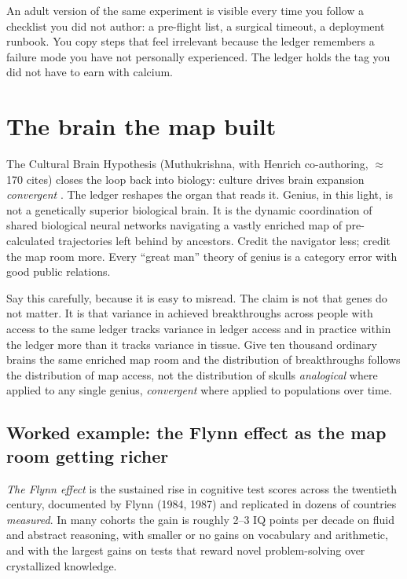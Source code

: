 An adult version of the same experiment is visible every time you follow a checklist you did not author: a pre-flight list, a surgical timeout, a deployment runbook. You copy steps that feel irrelevant because the ledger remembers a failure mode you have not personally experienced. The ledger holds the tag you did not have to earn with calcium.

\section{The brain the map built}

The Cultural Brain Hypothesis (Muthukrishna, with Henrich co-authoring, $\approx$170 cites) closes the loop back into biology: culture drives brain expansion \textit{convergent} \citep{henrich}. The ledger reshapes the organ that reads it. Genius, in this light, is not a genetically superior biological brain. It is the dynamic coordination of shared biological neural networks navigating a vastly enriched map of pre-calculated trajectories left behind by ancestors. Credit the navigator less; credit the map room more. Every ``great man'' theory of genius is a category error with good public relations.

Say this carefully, because it is easy to misread. The claim is not that genes do not matter. It is that variance in achieved breakthroughs across people with access to the same ledger tracks variance in ledger access and in practice within the ledger more than it tracks variance in tissue. Give ten thousand ordinary brains the same enriched map room and the distribution of breakthroughs follows the distribution of map access, not the distribution of skulls \textit{analogical} where applied to any single genius, \textit{convergent} where applied to populations over time.

\subsection*{Worked example: the Flynn effect as the map room getting richer}

\textit{The Flynn effect} is the sustained rise in cognitive test scores across the twentieth century, documented by Flynn (1984, 1987) and replicated in dozens of countries \textit{measured}. In many cohorts the gain is roughly 2--3 IQ points per decade on fluid and abstract reasoning, with smaller or no gains on vocabulary and arithmetic, and with the largest gains on tests that reward novel problem-solving over crystallized knowledge.

